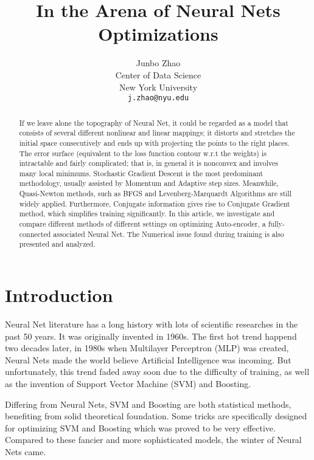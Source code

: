 \documentclass{article} %
\title{In the Arena of Neural Nets Optimizations}
\author{
Junbo Zhao \\
Center of Data Science\\
New York University\\
\texttt{j.zhao@nyu.edu} 
}
\begin{document}
\maketitle

\begin{abstract}
If we leave alone the topography of Neural Net, it could be regarded as a model that consists of several different nonlinear and linear mappings; it distorts and stretches the initial space consecutively and ends up with projecting the points to the right places. The error surface (equivalent to the loss function contour w.r.t the weights) is intractable and fairly complicated; that is, in general it is nonconvex and involves many local minimums. Stochastic Gradient Descent is the most predominant methodology, usually assisted by Momentum and Adaptive step sizes. Meanwhile, Quasi-Newton methods, such as BFGS and Levenberg-Marquardt Algorithms are still widely applied. Furthermore, Conjugate information gives rise to Conjugate Gradient method, which simplifies training significantly. In this article, we investigate and compare different methods of different settings on optimizing Auto-encoder, a fully-connected associated Neural Net. The Numerical issue found during training is also presented and analyzed.
\end{abstract}

\section{Introduction}
Neural Net literature has a long history with lots of scientific researches in the past 50 years. It was originally invented in 1960s. The first hot trend happend two decades later, in 1980s when Multilayer Perceptron (MLP) was created, Neural Nets made the world believe Artificial Intelligence was incoming. But unfortunately, this trend faded away soon due to the difficulty of training, as well as the invention of Support Vector Machine (SVM) and Boosting. 

Differing from Neural Nets, SVM and Boosting are both statistical methods, benefiting from solid theoretical foundation. Some tricks are specifically designed for optimizing SVM and Boosting which was proved to be very effective. Compared to these fancier and more sophisticated models, the winter of Neural Nets came.
\end{document}
